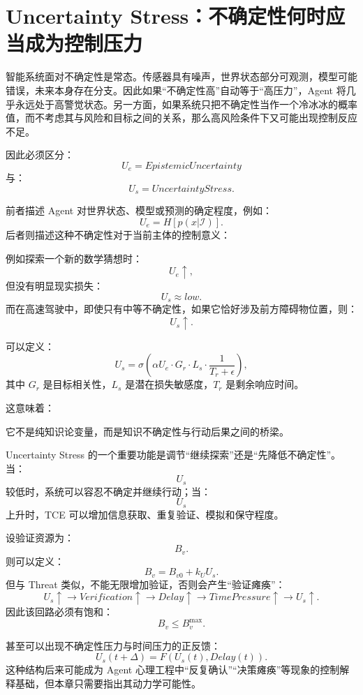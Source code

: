 \section{Uncertainty Stress：不确定性何时应当成为控制压力}

智能系统面对不确定性是常态。传感器具有噪声，世界状态部分可观测，模型可能错误，未来本身存在分支。因此如果“不确定性高”自动等于“高压力”，Agent 将几乎永远处于高警觉状态。另一方面，如果系统只把不确定性当作一个冷冰冰的概率值，而不考虑其与风险和目标之间的关系，那么高风险条件下又可能出现控制反应不足。

因此必须区分：
\[
U_e
=
EpistemicUncertainty
\]
与：
\[
U_s
=
UncertaintyStress.
\]

前者描述 Agent 对世界状态、模型或预测的确定程度，例如：
\[
U_e
=
H[p(x|\mathcal I)].
\]
后者则描述这种不确定性对于当前主体的控制意义：
\begin{statementbox}
\centering
{}
\end{statementbox}

例如探索一个新的数学猜想时：
\[
U_e\uparrow,
\]
但没有明显现实损失：
\[
U_s\approx low.
\]
而在高速驾驶中，即使只有中等不确定性，如果它恰好涉及前方障碍物位置，则：
\[
U_s\uparrow.
\]

可以定义：
\[
U_s
=
\sigma
\left(
\alpha U_e
\cdot
G_r
\cdot
L_s
\cdot
\frac{1}{T_r+\epsilon}
\right),
\]
其中 \(G_r\) 是目标相关性，\(L_s\) 是潜在损失敏感度，\(T_r\) 是剩余响应时间。

这意味着：
\begin{statementbox}
\centering
{}
\end{statementbox}
它不是纯知识论变量，而是知识不确定性与行动后果之间的桥梁。

Uncertainty Stress 的一个重要功能是调节“继续探索”还是“先降低不确定性”。当：
\[
U_s
\]
较低时，系统可以容忍不确定并继续行动；当：
\[
U_s
\]
上升时，TCE 可以增加信息获取、重复验证、模拟和保守程度。

设验证资源为：
\[
B_v.
\]
则可以定义：
\[
B_v
=
B_{v0}
+
k_U U_s.
\]
但与 Threat 类似，不能无限增加验证，否则会产生“验证瘫痪”：
\[
U_s\uparrow
\rightarrow
Verification\uparrow
\rightarrow
Delay\uparrow
\rightarrow
TimePressure\uparrow
\rightarrow
U_s\uparrow.
\]
因此该回路必须有饱和：
\[
B_v\leq B_v^{\max}.
\]

甚至可以出现不确定性压力与时间压力的正反馈：
\[
U_s(t+\Delta)
=
F(
U_s(t),
Delay(t)
).
\]
这种结构后来可能成为 Agent 心理工程中“反复确认”“决策瘫痪”等现象的控制解释基础，但本章只需要指出其动力学可能性。

